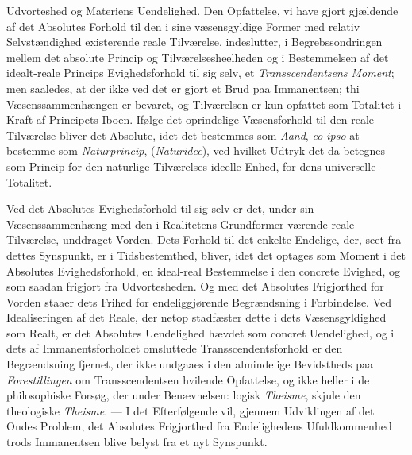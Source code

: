 Udvorteshed og Materiens Uendelighed.
 Den Opfattelse, vi have gjort gjældende af det Absolutes Forhold til den i sine
væsensgyldige Former med relativ Selvstændighed existerende reale Tilværelse,
indeslutter, i Begrebssondringen mellem det absolute Princip og
Tilværelsesheelheden og i Bestemmelsen af det idealt-reale Princips
Evighedsforhold til sig selv, et \emph{Transscendentsens Moment}; men saaledes,
at der ikke ved det er gjort et Brud paa Immanentsen; thi Væsenssammenhængen er
bevaret, og Tilværelsen er kun opfattet som Totalitet i Kraft af Principets
Iboen. Ifølge det oprindelige Væsensforhold til den reale Tilværelse bliver det
Absolute, idet det bestemmes som \emph{Aand}, \textit{eo ipso} at bestemme som
\emph{Naturprincip}, (\emph{Naturidee}), ved hvilket Udtryk det da betegnes som
Princip for den naturlige Tilværelses ideelle Enhed, for dens universelle
Totalitet.

Ved det Absolutes Evighedsforhold til sig selv er det, under sin
Væsenssammenhæng med den i Realitetens Grundformer værende reale Tilværelse,
unddraget Vorden. Dets Forhold til det enkelte Endelige, der, seet fra dettes
Synspunkt, er i Tidsbestemthed, bliver, idet det optages som Moment i det
Absolutes Evighedsforhold, en ideal-real Bestemmelse i den concrete Evighed, og
som saadan frigjort fra Udvortesheden. Og med det Absolutes Frigjorthed for
Vorden staaer dets Frihed for endeliggjørende Begrændsning i Forbindelse. Ved
Idealiseringen af det Reale, der netop stadfæster dette i dets Væsensgyldighed
som Realt, er det Absolutes Uendelighed hævdet som concret Uendelighed, og i
dets af Immanentsforholdet omsluttede Transscendentsforhold er den Begrændsning
fjernet, der ikke undgaaes i den almindelige Bevidstheds paa
\emph{Forestillingen} om Transscendentsen hvilende Opfattelse, og ikke heller i
de philosophiske Forsøg, der under Benævnelsen: logisk \emph{Theisme}, skjule
den theologiske \emph{Theisme}. --- I det Efterfølgende vil, gjennem Udviklingen
af det Ondes Problem, det Absolutes Frigjorthed fra Endelighedens
Ufuldkommenhed trods Immanentsen blive belyst fra et nyt Synspunkt.

